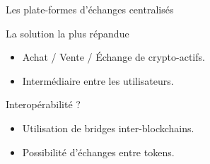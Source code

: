 \begin{frame}{Les plate-formes d'échanges centralisés}
    \begin{block}{La solution la plus répandue}
        \begin{itemize}
            \item Achat / Vente / Échange de crypto-actifs.
            \item Intermédiaire entre les utilisateurs.
        \end{itemize}
    \end{block}
    \begin{block}{Interopérabilité ?}
        \begin{itemize}
            \item Utilisation de bridges inter-blockchains.
            \item Possibilité d'échanges entre tokens.
        \end{itemize}
    \end{block}
\end{frame}

